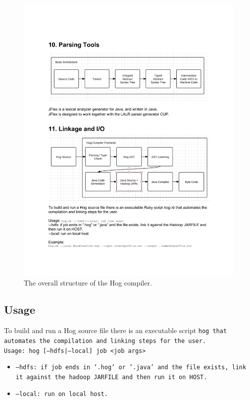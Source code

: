 \documentclass{report}
\begin{document}
\begin{center}
\begin{figure}
  \label{fig:hog_compiler}
  \includegraphics[width=1.0\textwidth]{img/hog_compiler.pdf}
  \caption{The overall structure of the Hog compiler.}
\end{figure}
\end{center}

\subsection{Usage} %
\label{sub:usage}


To build and run a Hog source file there is an executable script \tt hog
\rm that automates the compilation and linking steps for the user. \\

Usage: \tt hog [--hdfs|--local] job <job args> \rm
\begin{itemize}
  \item[] \tt --hdfs\rm: if job ends in '.hog' or '.java' and the file exists, link it against the hadoop JARFILE and then run it on HOST.
  \item[] \tt --local\rm: run on local host.
\end{itemize}
\end{document}

